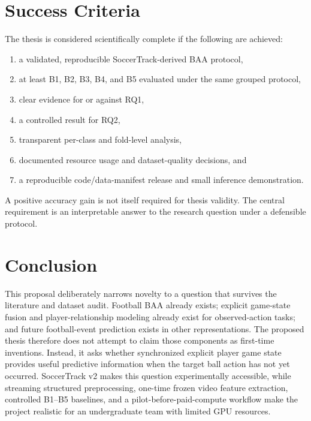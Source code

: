 \documentclass[11pt,a4paper]{article}
\begin{document}
\section{Success Criteria}
The thesis is considered scientifically complete if the following are achieved:
\begin{enumerate}
  \item a validated, reproducible SoccerTrack-derived BAA protocol,
  \item at least B1, B2, B3, B4, and B5 evaluated under the same grouped protocol,
  \item clear evidence for or against RQ1,
  \item a controlled result for RQ2,
  \item transparent per-class and fold-level analysis,
  \item documented resource usage and dataset-quality decisions, and
  \item a reproducible code/data-manifest release and small inference demonstration.
\end{enumerate}
A positive accuracy gain is not itself required for thesis validity. The central requirement is an interpretable answer to the research question under a defensible protocol.

\section{Conclusion}
This proposal deliberately narrows novelty to a question that survives the literature and dataset audit. Football BAA already exists; explicit game-state fusion and player-relationship modeling already exist for observed-action tasks; and future football-event prediction exists in other representations. The proposed thesis therefore does not attempt to claim those components as first-time inventions. Instead, it asks whether synchronized explicit player game state provides useful predictive information when the target ball action has not yet occurred. SoccerTrack v2 makes this question experimentally accessible, while streaming structured preprocessing, one-time frozen video feature extraction, controlled B1--B5 baselines, and a pilot-before-paid-compute workflow make the project realistic for an undergraduate team with limited GPU resources.

\newpage
\end{document}
